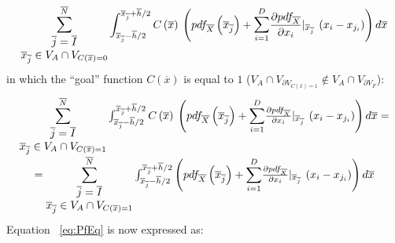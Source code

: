 \begin{equation}
\mathlarger{\sum}_{\begin{matrix}
\overline{j}=\overline{I} \\ \overline{x}_{\overline{j}} \in V_{A} \cap V_{C(\overline{x})=0} \end{matrix}}^{\overline{N}}
\int_{\overline{x}_{\overline{j}} - \overline{h}/2}^{\overline{x}_{\overline{j}} + \overline{h}/2} C\left ( \overline{x} \right )\:
\left ( pdf_{\overline{X}}\left ( \overline{x}_{\overline{j}} \right ) +
\mathlarger{\sum}_{i=1}^{D} \frac{\partial pdf_{\overline{X}}}{\partial x_{i}}|_{\overline{x}_{\overline{j}}} \: \left ( x_{i} - x_{j_{i}} \right ) \right )   d\overline{x}
\end{equation}
in which the  ``goal''  function $C(\overline{x})$ is equal to $1$ ($V_{A} \cap V_{\partial V_{C(\overline{x})=1}} \notin V_{A} \cap V_{\partial V_{F}}$):
\begin{equation}
\begin{matrix}
\mathlarger{\sum}_{\begin{matrix}
\overline{j}=\overline{I} \\ \overline{x}_{\overline{j}} \in V_{A} \cap V_{C(\overline{x})=1} \end{matrix}}^{\overline{N}}
\int_{\overline{x}_{\overline{j}} - \overline{h}/2}^{\overline{x}_{\overline{j}} + \overline{h}/2} C\left ( \overline{x} \right )\:
\left ( pdf_{\overline{X}}\left ( \overline{x}_{\overline{j}} \right ) +
\mathlarger{\sum}_{i=1}^{D} \frac{\partial pdf_{\overline{X}}}{\partial x_{i}}|_{\overline{x}_{\overline{j}}} \: \left ( x_{i} - x_{j_{i}} \right ) \right )   d\overline{x} =
\\
= \mathlarger{\sum}_{\begin{matrix}
\overline{j}=\overline{I} \\ \overline{x}_{\overline{j}} \in V_{A} \cap V_{C(\overline{x})=1} \end{matrix}}^{\overline{N}}
\int_{\overline{x}_{\overline{j}} - \overline{h}/2}^{\overline{x}_{\overline{j}} + \overline{h}/2}
\left ( pdf_{\overline{X}}\left ( \overline{x}_{\overline{j}} \right ) +
\mathlarger{\sum}_{i=1}^{D} \frac{\partial pdf_{\overline{X}}}{\partial x_{i}}|_{\overline{x}_{\overline{j}}} \: \left ( x_{i} - x_{j_{i}} \right ) \right )   d\overline{x}
\end{matrix}
\end{equation}
Equation ~\ref{eq:PfEq} is now expressed as:
